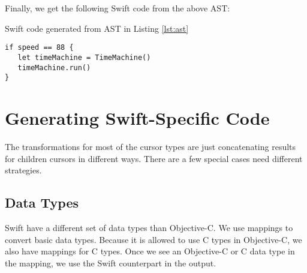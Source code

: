 \documentclass{sfuthesis}
\begin{document}
Finally, we get the following Swift code from the above AST:

\begin{listing}[H]
\caption{Swift code generated from AST in Listing \ref{lst:ast}}
\begin{verbatim}
if speed == 88 {
   let timeMachine = TimeMachine()
   timeMachine.run()
}
\end{verbatim}
\end{listing}

\section{Generating Swift-Specific Code}

The transformations for most of the cursor types are just concatenating results for children cursors in different ways. There are a few special cases need different strategies.

\subsection{Data Types}

Swift have a different set of data types than Objective-C. We use mappings to convert basic data types. Because it is allowed to use C types in Objective-C, we also have mappings for C types. Once we see an Objective-C or C data type in the mapping, we use the Swift counterpart in the output.

\newcommand{\specialcell}[2][c]{%
  \begin{tabular}[#1]{@{}c@{}}#2\end{tabular}}
\end{document}
